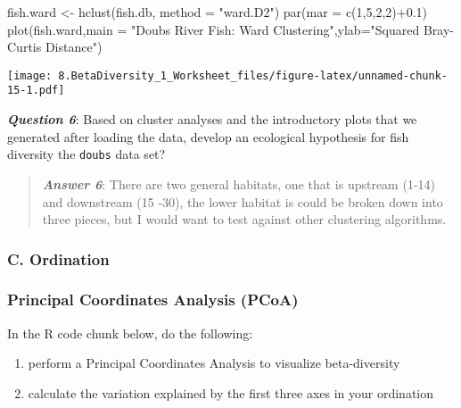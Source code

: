 \documentclass[
]{article}
\newenvironment{Shaded}{\begin{snugshade}}{\end{snugshade}}
\newcommand{\AttributeTok}[1]{\textcolor[rgb]{0.77,0.63,0.00}{#1}}
\newcommand{\DecValTok}[1]{\textcolor[rgb]{0.00,0.00,0.81}{#1}}
\newcommand{\FloatTok}[1]{\textcolor[rgb]{0.00,0.00,0.81}{#1}}
\newcommand{\FunctionTok}[1]{\textcolor[rgb]{0.00,0.00,0.00}{#1}}
\newcommand{\NormalTok}[1]{#1}
\newcommand{\OtherTok}[1]{\textcolor[rgb]{0.56,0.35,0.01}{#1}}
\newcommand{\SpecialCharTok}[1]{\textcolor[rgb]{0.00,0.00,0.00}{#1}}
\newcommand{\StringTok}[1]{\textcolor[rgb]{0.31,0.60,0.02}{#1}}
\providecommand{\tightlist}{%
  \setlength{\itemsep}{0pt}\setlength{\parskip}{0pt}}
\begin{document}
\begin{Shaded}
\begin{Highlighting}[]
\NormalTok{fish.ward }\OtherTok{\textless{}{-}} \FunctionTok{hclust}\NormalTok{(fish.db, }\AttributeTok{method =} \StringTok{"ward.D2"}\NormalTok{)}
\FunctionTok{par}\NormalTok{(}\AttributeTok{mar =} \FunctionTok{c}\NormalTok{(}\DecValTok{1}\NormalTok{,}\DecValTok{5}\NormalTok{,}\DecValTok{2}\NormalTok{,}\DecValTok{2}\NormalTok{)}\SpecialCharTok{+}\FloatTok{0.1}\NormalTok{)}
\FunctionTok{plot}\NormalTok{(fish.ward,}\AttributeTok{main =} \StringTok{"Doubs River Fish: Ward Clustering"}\NormalTok{,}\AttributeTok{ylab=}\StringTok{"Squared Bray{-}Curtis Distance"}\NormalTok{)}
\end{Highlighting}
\end{Shaded}

\texttt{[image: 8.BetaDiversity\_1\_Worksheet\_files/figure-latex/unnamed-chunk-15-1.pdf]}

\textbf{\emph{Question 6}}: Based on cluster analyses and the
introductory plots that we generated after loading the data, develop an
ecological hypothesis for fish diversity the \texttt{doubs} data set?

\begin{quote}
\textbf{\emph{Answer 6}}: There are two general habitats, one that is
upstream (1-14) and downstream (15 -30), the lower habitat is could be
broken down into three pieces, but I would want to test against other
clustering algorithms.
\end{quote}

\hypertarget{c.-ordination}{%
\subsubsection{C. Ordination}\label{c.-ordination}}

\hypertarget{principal-coordinates-analysis-pcoa}{%
\subsubsection{Principal Coordinates Analysis
(PCoA)}\label{principal-coordinates-analysis-pcoa}}

In the R code chunk below, do the following:

\begin{enumerate}
\def\labelenumi{\arabic{enumi}.}
\tightlist
\item
  perform a Principal Coordinates Analysis to visualize beta-diversity
\item
  calculate the variation explained by the first three axes in your
  ordination
\end{enumerate}
\end{document}
